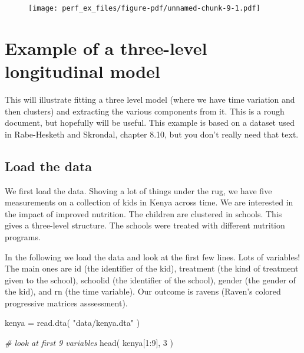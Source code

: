 \documentclass[
  letterpaper,
  DIV=11,
  numbers=noendperiod]{scrreprt}
\newenvironment{Shaded}{\begin{snugshade}}{\end{snugshade}}
\newcommand{\CommentTok}[1]{\textcolor[rgb]{0.38,0.63,0.69}{\textit{#1}}}
\newcommand{\DecValTok}[1]{\textcolor[rgb]{0.25,0.63,0.44}{#1}}
\newcommand{\FunctionTok}[1]{\textcolor[rgb]{0.02,0.16,0.49}{#1}}
\newcommand{\NormalTok}[1]{\textcolor[rgb]{0.00,0.44,0.13}{#1}}
\newcommand{\OtherTok}[1]{\textcolor[rgb]{0.00,0.44,0.13}{#1}}
\newcommand{\SpecialCharTok}[1]{\textcolor[rgb]{0.25,0.44,0.63}{#1}}
\newcommand{\StringTok}[1]{\textcolor[rgb]{0.25,0.44,0.63}{#1}}
\begin{document}
\begin{figure}[H]

{\centering \texttt{[image: perf\_ex\_files/figure-pdf/unnamed-chunk-9-1.pdf]}

}

\end{figure}

\hypertarget{example-of-a-three-level-longitudinal-model}{%
\chapter{Example of a three-level longitudinal
model}\label{example-of-a-three-level-longitudinal-model}}

This will illustrate fitting a three level model (where we have time
variation and then clusters) and extracting the various components from
it. This is a rough document, but hopefully will be useful. This example
is based on a dataset used in Rabe-Hesketh and Skrondal, chapter 8.10,
but you don't really need that text.

\hypertarget{load-the-data-1}{%
\section{Load the data}\label{load-the-data-1}}

We first load the data. Shoving a lot of things under the rug, we have
five measurements on a collection of kids in Kenya across time. We are
interested in the impact of improved nutrition. The children are
clustered in schools. This gives a three-level structure. The schools
were treated with different nutrition programs.

In the following we load the data and look at the first few lines. Lots
of variables! The main ones are id (the identifier of the kid),
treatment (the kind of treatment given to the school), schoolid (the
identifier of the school), gender (the gender of the kid), and rn (the
time variable). Our outcome is ravens (Raven's colored progressive
matrices asssessment).

\begin{Shaded}
\begin{Highlighting}[]
\NormalTok{kenya }\OtherTok{=} \FunctionTok{read.dta}\NormalTok{( }\StringTok{"data/kenya.dta"}\NormalTok{ )}

\CommentTok{\# look at first 9 variables}
\FunctionTok{head}\NormalTok{( kenya[}\DecValTok{1}\SpecialCharTok{:}\DecValTok{9}\NormalTok{], }\DecValTok{3}\NormalTok{ )}
\end{Highlighting}
\end{Shaded}
\end{document}
